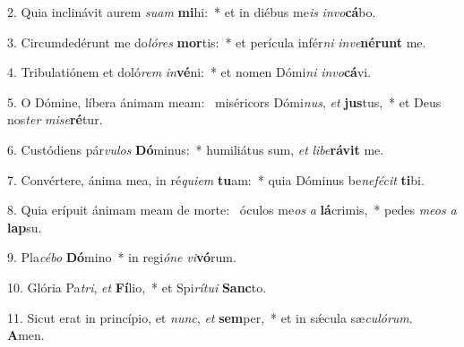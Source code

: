 2. Quia inclinávit aurem \textit{su}\textit{am} \textbf{mi}hi:~*  et in diébus me\textit{is} \textit{in}\textit{vo}\textbf{cá}bo.\

3. Circumdedérunt me do\textit{ló}\textit{res} \textbf{mor}tis:~*  et perícula infér\textit{ni} \textit{in}\textit{ve}\textbf{né}\textbf{runt} me.\

4. Tribulatiónem et doló\textit{rem} \textit{in}\textbf{vé}ni:~*  et nomen Dómi\textit{ni} \textit{in}\textit{vo}\textbf{cá}vi.\

5. O Dómine, líbera ánimam meam: \dag\  miséricors Dómi\textit{nus}, \textit{et} \textbf{jus}tus,~*  et Deus nos\textit{ter} \textit{mi}\textit{se}\textbf{ré}tur.\

6. Custódiens pár\textit{vu}\textit{los} \textbf{Dó}minus:~*  humiliátus sum, \textit{et} \textit{li}\textit{be}\textbf{rá}\textbf{vit} me.\

7. Convértere, ánima mea, in ré\textit{qui}\textit{em} \textbf{tu}am:~*  quia Dóminus be\textit{ne}\textit{fé}\textit{cit} \textbf{ti}bi.\

8. Quia erípuit ánimam meam de morte: \dag\  óculos me\textit{os} \textit{a} \textbf{lá}crimis,~*  pedes \textit{me}\textit{os} \textit{a} \textbf{lap}su.\

9. Pla\textit{cé}\textit{bo} \textbf{Dó}mino~*  in regi\textit{ó}\textit{ne} \textit{vi}\textbf{vó}rum.\

10. Glória Pa\textit{tri}, \textit{et} \textbf{Fí}lio,~*  et Spi\textit{rí}\textit{tu}\textit{i} \textbf{Sanc}to.\

11. Sicut erat in princípio, et \textit{nunc}, \textit{et} \textbf{sem}per,~*  et in sǽcula sæ\textit{cu}\textit{ló}\textit{rum}. \textbf{A}men.\

